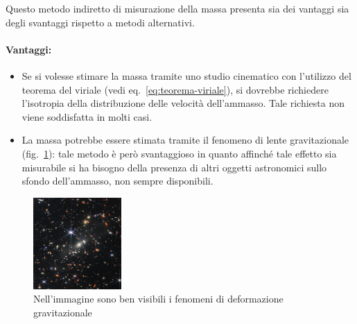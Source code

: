 Questo metodo indiretto di misurazione della massa presenta sia dei vantaggi sia degli svantaggi rispetto a metodi alternativi.

\paragraph*{Vantaggi:}
\begin{itemize}
    \item Se si volesse stimare la massa tramite uno studio cinematico con l'utilizzo del teorema del viriale (vedi eq.~\ref{eq:teorema-viriale}), si dovrebbe richiedere l'isotropia della distribuzione delle velocità dell'ammasso. Tale richiesta non viene soddisfatta in molti casi. 
    \item La massa potrebbe essere stimata tramite il fenomeno di lente gravitazionale (fig.~\ref{fig:lensing}): tale metodo è però svantaggioso in quanto affinché tale effetto sia misurabile si ha bisogno della presenza di altri oggetti astronomici sullo sfondo dell’ammasso, non sempre disponibili.
\end{itemize} 

\begin{figure}[htb]
    \centering
    \includegraphics[width = 0.3\textwidth]{immagini/lensing.png}
    \caption{Nell'immagine sono ben visibili i fenomeni di deformazione gravitazionale}
    \label{fig:lensing}
\end{figure}

